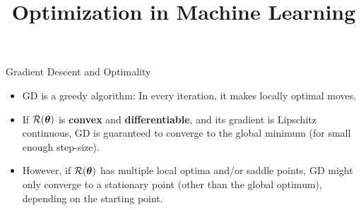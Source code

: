 \documentclass[11pt,compress,t,notes=noshow, xcolor=table]{beamer}
\title{Optimization in Machine Learning}
\date{}
\begin{document}
\sloppy
	
\begin{vbframe}{Gradient Descent and Optimality}
		
		\begin{minipage}{0.45\textwidth}
			\begin{small}
				\begin{itemize}
					\item GD is a greedy algorithm: In every iteration, it makes locally optimal moves.
					\vspace*{0.5mm}
					\item If $\mathcal{R}(\bm{\theta})$ is \textbf{convex} and \textbf{differentiable}, and its gradient is Lipschitz continuous, GD is guaranteed to converge to the global minimum (for small enough step-size).  
					\vspace*{0.5mm}
					\item However, if $\mathcal{R}(\bm{\theta})$ has multiple local optima and/or saddle points, GD might only converge to a stationary point (other than the global optimum), depending on the starting point. 
				\end{itemize}
			\end{small}
		\end{minipage}\hfill
		\begin{minipage}{0.5\textwidth}
			\begin{figure}
				\centering

\end{figure}
\end{minipage}
\end{vbframe}
\end{document}
